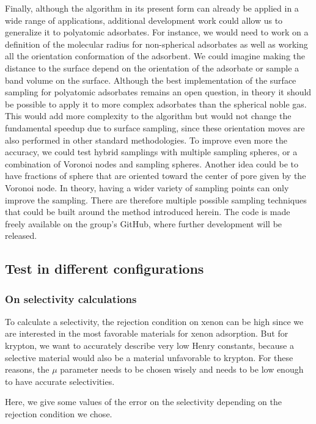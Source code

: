 \documentclass[main]{subfiles}
\begin{document}
Finally, although the algorithm in its present form can already be applied in a wide range of applications, additional development work could allow us to generalize it to polyatomic adsorbates. For instance, we would need to {work on a definition of the molecular radius for non-spherical adsorbates as well as working} all the orientation conformation of the adsorbent. {We could imagine making the distance to the surface depend on the orientation of the adsorbate or sample a band volume on the surface. Although the best implementation of the surface sampling for polyatomic adsorbates remains an open question, in theory it should be possible to apply it to more complex adsorbates than the spherical noble gas. } This would add more complexity to the algorithm but would not change the fundamental speedup due to surface sampling, since these orientation moves are also performed in other standard methodologies. To improve even more the accuracy, we could test hybrid samplings with multiple sampling spheres, or a combination of Voronoi nodes and sampling spheres. Another idea could be to have fractions of sphere that are oriented toward the center of pore given by the Voronoi node. In theory, having a wider variety of sampling points can only improve the sampling. There are therefore multiple possible sampling techniques that could be built around the method introduced herein. {The code is made freely available on the group's GitHub, where further development will be released.}


\subsection{Test in different configurations}

\subsubsection{On selectivity calculations}

To calculate a selectivity, the rejection condition on xenon can be high since we are interested in the most favorable materials for xenon adsorption. But for krypton, we want to accurately describe very low Henry constants, because a selective material would also be a material unfavorable to krypton. For these reasons, the $\mu$ parameter needs to be chosen wisely and needs to be low enough to have accurate selectivities. 

Here, we give some values of the error on the selectivity depending on the rejection condition we chose. 
\end{document}
